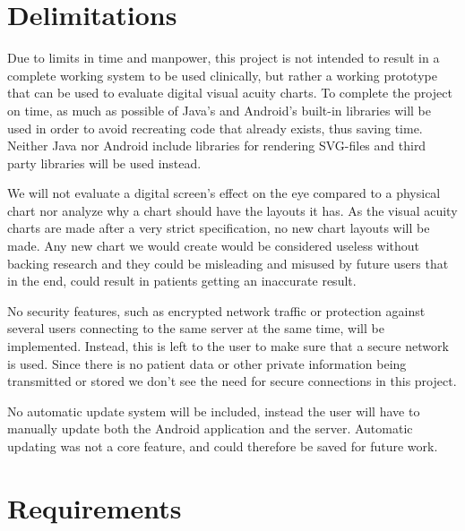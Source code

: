 \documentclass[12pt,a4paper,notitlepage]{report}
\begin{document}
\section{Delimitations}
Due to limits in time and manpower, this project is not intended to result in a complete working system to be used clinically, but rather a working prototype that can be used to evaluate digital visual acuity charts. To complete the project on time, as much as possible of Java's and Android's built-in libraries will be used in order to avoid recreating code that already exists, thus saving time. Neither Java nor Android include libraries for rendering SVG-files and third party libraries will be used instead.


We will not evaluate a digital screen's effect on the eye compared to a physical chart nor analyze why a chart should have the layouts it has. As the visual acuity charts are made after a very strict specification, no new chart layouts will be made. Any new chart we would create would be considered useless without backing research and they could be misleading and misused by future users that in the end, could result in patients getting an inaccurate result.

No security features, such as encrypted network traffic or protection against several users connecting to the same server at the same time, will be implemented. Instead, this is left to the user to make sure that a secure network is used. Since there is no patient data or other private information being transmitted or stored we don't see the need for secure connections in this project.

No automatic update system will be included, instead the user will have to manually update both the Android application and the server. Automatic updating was not a core feature, and could therefore be saved for future work.

\section{Requirements}
\end{document}
